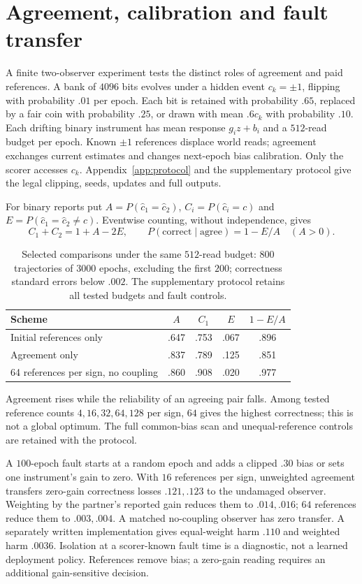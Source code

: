 \documentclass[12pt]{article}
\theoremstyle{definition}
\theoremstyle{remark}
\begin{document}
\section{Agreement, calibration and fault transfer}\label{sec:model}

A finite two-observer experiment tests the distinct roles of agreement
and paid references. A bank of $4096$ bits evolves under a hidden event
$c_k=\pm1$, flipping with probability $.01$ per epoch. Each bit is
retained with probability $.65$, replaced by a fair coin with probability
$.25$, or drawn with mean $.6c_k$ with probability $.10$.
Each drifting binary instrument has mean response $g_i z+b_i$ and a
$512$-read budget per epoch. Known $\pm1$ references displace world
reads; agreement exchanges current estimates and changes next-epoch
bias calibration. Only the scorer accesses $c_k$.
Appendix~\ref{app:protocol} and the supplementary protocol give the
legal clipping, seeds, updates and full outputs.

For binary reports put $A=P(\hat c_1=\hat c_2)$,
$C_i=P(\hat c_i=c)$ and $E=P(\hat c_1=\hat c_2\ne c)$.
Eventwise counting, without independence, gives
\[
 C_1+C_2=1+A-2E,\qquad
 P(\mathrm{correct}\mid\mathrm{agree})=1-E/A\quad(A>0).
\]
\begin{table}[htbp]
\centering
\begin{tabular}{lcccc}
\hline
Scheme & $A$ & $C_1$ & $E$ & $1-E/A$\\\hline
Initial references only & .647 & .753 & .067 & .896\\
Agreement only & .837 & .789 & .125 & .851\\
64 references per sign, no coupling & .860 & .908 & .020 & .977\\\hline
\end{tabular}
\caption{Selected comparisons under the same $512$-read budget:
$800$ trajectories of $3000$ epochs, excluding the first $200$;
correctness standard errors below $.002$. The supplementary protocol
retains all tested budgets and fault controls.}
\label{tab:agree}
\end{table}

Agreement rises while the reliability of an agreeing pair falls.
Among tested reference counts $4,16,32,64,128$ per sign, $64$ gives
the highest correctness; this is not a global optimum.
The full common-bias scan and unequal-reference controls are retained
with the protocol.

A $100$-epoch fault starts at a random epoch and adds a clipped $.30$
bias or sets one instrument's gain to zero. With $16$ references per
sign, unweighted agreement transfers zero-gain correctness losses
$.121,.123$ to the undamaged observer. Weighting by the partner's
reported gain reduces them to $.014,.016$; $64$ references reduce
them to $.003,.004$. A matched no-coupling observer has zero transfer.
A separately written implementation gives equal-weight harm $.110$
and weighted harm $.0036$. Isolation at a scorer-known fault time is
a diagnostic, not a learned deployment policy. References remove bias;
a zero-gain reading requires an additional gain-sensitive decision.
\end{document}
